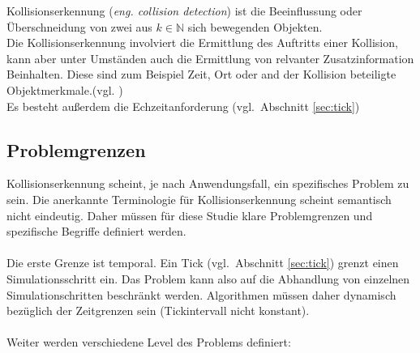 Kollisionserkennung (\textit{eng. collision detection}) ist die Beeinflussung oder Überschneidung von zwei aus $k\in\mathbb{N}$ sich bewegenden Objekten.\\
Die Kollisionserkennung involviert die Ermittlung des Auftritts einer Kollision, kann aber unter Umständen auch die Ermittlung von relvanter Zusatzinformation Beinhalten. Diese sind zum Beispiel Zeit, Ort oder and der Kollision beteiligte Objektmerkmale.(vgl. \cite[Abschn. 2]{cd2D})\\
Es besteht außerdem die Echzeitanforderung (vgl.~Abschnitt \ref{sec:tick})
\\
\subsection{Problemgrenzen}
Kollisionserkennung scheint, je nach Anwendungsfall, ein spezifisches Problem zu sein. Die anerkannte Terminologie für Kollisionserkennung scheint semantisch nicht eindeutig. Daher müssen für diese Studie klare Problemgrenzen und spezifische Begriffe definiert werden.\\
\\
Die erste Grenze ist temporal. Ein Tick (vgl.~Abschnitt \ref{sec:tick}) grenzt einen Simulationsschritt ein. Das Problem kann also auf die Abhandlung von einzelnen Simulationschritten beschränkt werden. Algorithmen müssen daher dynamisch bezüglich der Zeitgrenzen sein (Tickintervall nicht konstant).\\
\\
Weiter werden verschiedene Level des Problems definiert:
